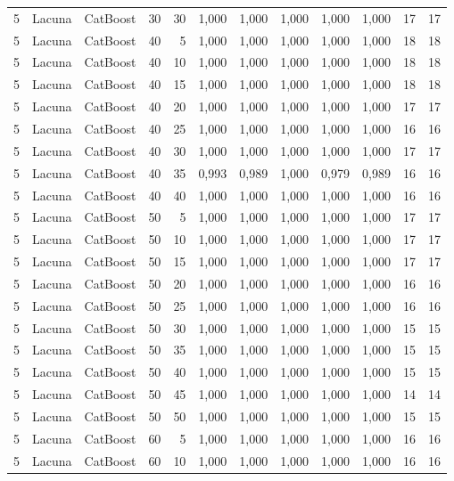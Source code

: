\begin{longtable}{@{}rllrrrrrrrrr@{}}
5 & Lacuna & CatBoost & 30 & 30 & 1,000 & 1,000 & 1,000 & 1,000 & 1,000 & 17 & 17 \\
5 & Lacuna & CatBoost & 40 & 5 & 1,000 & 1,000 & 1,000 & 1,000 & 1,000 & 18 & 18 \\
5 & Lacuna & CatBoost & 40 & 10 & 1,000 & 1,000 & 1,000 & 1,000 & 1,000 & 18 & 18 \\
5 & Lacuna & CatBoost & 40 & 15 & 1,000 & 1,000 & 1,000 & 1,000 & 1,000 & 18 & 18 \\
5 & Lacuna & CatBoost & 40 & 20 & 1,000 & 1,000 & 1,000 & 1,000 & 1,000 & 17 & 17 \\
5 & Lacuna & CatBoost & 40 & 25 & 1,000 & 1,000 & 1,000 & 1,000 & 1,000 & 16 & 16 \\
5 & Lacuna & CatBoost & 40 & 30 & 1,000 & 1,000 & 1,000 & 1,000 & 1,000 & 17 & 17 \\
5 & Lacuna & CatBoost & 40 & 35 & 0,993 & 0,989 & 1,000 & 0,979 & 0,989 & 16 & 16 \\
5 & Lacuna & CatBoost & 40 & 40 & 1,000 & 1,000 & 1,000 & 1,000 & 1,000 & 16 & 16 \\
5 & Lacuna & CatBoost & 50 & 5 & 1,000 & 1,000 & 1,000 & 1,000 & 1,000 & 17 & 17 \\
5 & Lacuna & CatBoost & 50 & 10 & 1,000 & 1,000 & 1,000 & 1,000 & 1,000 & 17 & 17 \\
5 & Lacuna & CatBoost & 50 & 15 & 1,000 & 1,000 & 1,000 & 1,000 & 1,000 & 17 & 17 \\
5 & Lacuna & CatBoost & 50 & 20 & 1,000 & 1,000 & 1,000 & 1,000 & 1,000 & 16 & 16 \\
5 & Lacuna & CatBoost & 50 & 25 & 1,000 & 1,000 & 1,000 & 1,000 & 1,000 & 16 & 16 \\
5 & Lacuna & CatBoost & 50 & 30 & 1,000 & 1,000 & 1,000 & 1,000 & 1,000 & 15 & 15 \\
5 & Lacuna & CatBoost & 50 & 35 & 1,000 & 1,000 & 1,000 & 1,000 & 1,000 & 15 & 15 \\
5 & Lacuna & CatBoost & 50 & 40 & 1,000 & 1,000 & 1,000 & 1,000 & 1,000 & 15 & 15 \\
5 & Lacuna & CatBoost & 50 & 45 & 1,000 & 1,000 & 1,000 & 1,000 & 1,000 & 14 & 14 \\
5 & Lacuna & CatBoost & 50 & 50 & 1,000 & 1,000 & 1,000 & 1,000 & 1,000 & 15 & 15 \\
5 & Lacuna & CatBoost & 60 & 5 & 1,000 & 1,000 & 1,000 & 1,000 & 1,000 & 16 & 16 \\
5 & Lacuna & CatBoost & 60 & 10 & 1,000 & 1,000 & 1,000 & 1,000 & 1,000 & 16 & 16 \\

\end{longtable}
